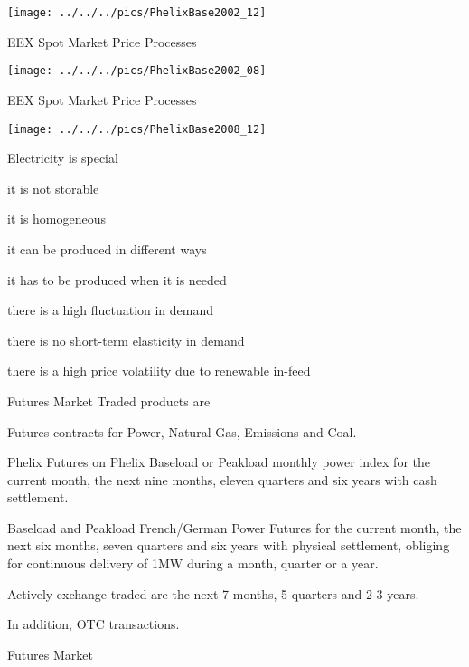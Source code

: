 \texttt{[image: ../../../pics/PhelixBase2002\_12]}

{EEX Spot Market Price Processes}

\texttt{[image: ../../../pics/PhelixBase2002\_08]}

{EEX Spot Market Price Processes}

\texttt{[image: ../../../pics/PhelixBase2008\_12]}

{Electricity is special}
\item<1-> it is not storable
\item<2-> it is homogeneous
\item<3-> it can be produced in different ways
\item<4-> it has to be produced when it is needed
\item<5-> there is a high fluctuation in demand
\item<6-> there is no short-term elasticity in demand
\item<7-> there is a high price volatility due to renewable in-feed


{Futures Market} Traded products are
\item<1->Futures contracts for Power, Natural Gas, Emissions and Coal.
\item<2->Phelix Futures on Phelix Baseload or Peakload monthly power index for the current month, the next nine months, eleven quarters and six years with cash settlement.
\item<3-> Baseload and Peakload French/German Power Futures for the current month, the next six months, seven quarters and six years with physical settlement, obliging for continuous delivery of 1MW during a month, quarter or a year.
\item<4-> Actively exchange traded are the next 7 months, 5 quarters and 2-3 years.
\item<5-> In addition, OTC transactions.

{Futures Market}



